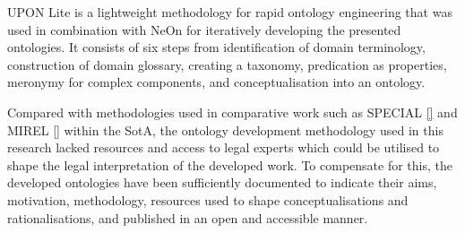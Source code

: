 UPON Lite \cite{} is a lightweight methodology for rapid ontology engineering that was used in combination with NeOn for iteratively developing the presented ontologies. It consists of six steps from identification of domain terminology, construction of domain glossary, creating a taxonomy, predication as properties, meronymy for complex components, and conceptualisation into an ontology.

Compared with methodologies used in comparative work such as SPECIAL \autoref{} and MIREL \autoref{} within the SotA, the ontology development methodology used in this research lacked resources and access to legal experts which could be utilised to shape the legal interpretation of the developed work. To compensate for this, the developed ontologies have been sufficiently documented to indicate their aims, motivation, methodology, resources used to shape conceptualisations and rationalisations, and published in an open and accessible manner.

